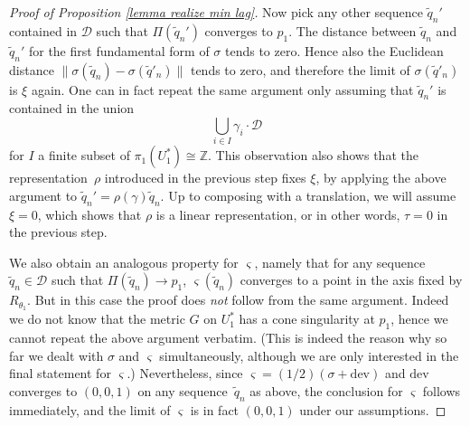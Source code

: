 \documentclass[JEP,XML,SOM,Unicode,NoEqCountersInSection,published]{cedram}
\let\mathcal\mathscr
\theoremstyle{definition}
\newcommand{\dev}{\mathrm{dev}}
\begin{document}
\begin{proof}[Proof of Proposition \ref{lemma realize min lag}]
Now pick any other sequence $\widetilde q_n'$ contained in $\mathcal D$ such that $\Pi(\widetilde q_n')$ converges to $p_1$. The distance between $\widetilde q_n$ and $\widetilde q_n'$ for the first fundamental form of $\sigma$ tends to zero. Hence also the Euclidean distance $\| \sigma(\widetilde q_n)- \sigma(\widetilde q'_n)\|$ tends to zero, and therefore the limit of $ \sigma(\widetilde q'_n)$ is $\xi$ again. One can in fact repeat the same argument only assuming that $\widetilde q_n'$ is contained in the union
\[
\bigcup_{i\in I} \gamma_i\cdot\mathcal D
\]
for $I$ a finite subset of $\pi_1(U_1^*)\cong\mathbb Z$. This observation also shows that the representation~$\rho$ introduced in the previous step fixes $\xi$, by applying the above argument to $\widetilde q_n'=\rho(\gamma)\widetilde q_n$. Up to composing with a translation, we will assume $\xi=0$, which shows that $\rho$ is a linear representation, or in other words, $\tau=0$ in the previous step.

We also obtain an analogous property for $\varsigma$, namely that for any sequence $\widetilde q_n\in\mathcal D$ such that $\Pi(\widetilde q_n)\to p_1$, $\varsigma (\widetilde q_n)$ converges to a point in the axis fixed by $R_{\theta_1}$. But in this case the proof does \emph{not} follow from the same argument. Indeed we do not know that the metric $G$ on $U_1^*$ has a cone singularity at $p_1$, hence we cannot repeat the above argument verbatim. (This is indeed the reason why so far we dealt with $\sigma$ and $\varsigma$ simultaneously, although we are only interested in the final statement for $\varsigma$.)
Nevertheless, since $\varsigma=(1/2)(\sigma+\dev)$ and $\dev$ converges to $(0,0,1)$ on any sequence~$\widetilde q_n$ as above, the conclusion for $\varsigma$ follows immediately, and the limit of $\varsigma$ is in fact $(0,0,1)$ under our assumptions.


\end{proof}
\end{document}
